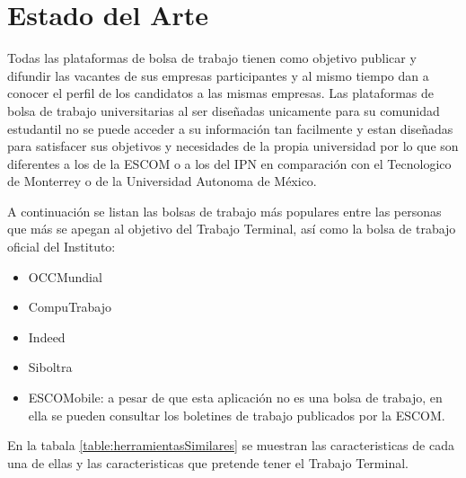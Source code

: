 \clearpage
\section{Estado del Arte}
Todas las plataformas de bolsa de trabajo tienen como objetivo publicar y difundir las vacantes de sus empresas participantes
y al mismo tiempo dan a conocer el perfil de los candidatos a las mismas empresas.
Las plataformas de bolsa de trabajo universitarias al ser diseñadas unicamente para su comunidad estudantil no se puede acceder 
a su información tan facilmente y estan diseñadas para satisfacer sus objetivos y necesidades de la propia universidad por lo que 
son diferentes a los de la ESCOM o  a los del IPN en comparación con el Tecnologico de Monterrey o de la Universidad Autonoma de México.
\newline

A continuación se listan las bolsas de trabajo más populares entre las personas que más se apegan al objetivo del Trabajo Terminal,
 así como  la bolsa de trabajo oficial del Instituto:
\begin{itemize}
    \item OCCMundial
    \item CompuTrabajo
    \item Indeed
    \item Siboltra 
    \item ESCOMobile: a pesar de que esta aplicación no es una bolsa de trabajo, en ella se pueden consultar los boletines de trabajo
    publicados por la ESCOM.
\end{itemize}
En la tabala \ref{table:herramientasSimilares} se muestran las caracteristicas de cada una de ellas y las caracteristicas que pretende tener el Trabajo Terminal.


